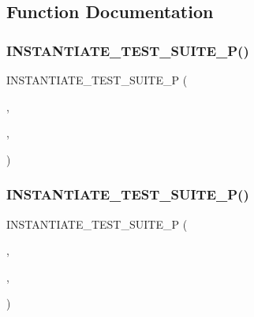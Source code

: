 \subsection{Function Documentation}
\mbox{\label{googletest-master_2googletest_2test_2googletest-test2__test_8cc_a9092fbc5f642e0be66474b214fae76c9}} 
\subsubsection{\texorpdfstring{INSTANTIATE\_TEST\_SUITE\_P()}{INSTANTIATE\_TEST\_SUITE\_P()}\hspace{0.1cm}{\footnotesize\ttfamily [1/2]}}
{\footnotesize\ttfamily I\+N\+S\+T\+A\+N\+T\+I\+A\+T\+E\+\_\+\+T\+E\+S\+T\+\_\+\+S\+U\+I\+T\+E\+\_\+P (\begin{DoxyParamCaption}\item[{Multiples\+Of33}]{,  }\item[{\mbox{\hyperlink{class_external_instantiation_test}{External\+Instantiation\+Test}}}]{,  }\item[{Values(33, 66)}]{ }\end{DoxyParamCaption})}

\mbox{\label{googletest-master_2googletest_2test_2googletest-test2__test_8cc_a636f24ec7688ea5d70c09b8b73639e55}} 
\subsubsection{\texorpdfstring{INSTANTIATE\_TEST\_SUITE\_P()}{INSTANTIATE\_TEST\_SUITE\_P()}\hspace{0.1cm}{\footnotesize\ttfamily [2/2]}}
{\footnotesize\ttfamily I\+N\+S\+T\+A\+N\+T\+I\+A\+T\+E\+\_\+\+T\+E\+S\+T\+\_\+\+S\+U\+I\+T\+E\+\_\+P (\begin{DoxyParamCaption}\item[{Sequence2}]{,  }\item[{\mbox{\hyperlink{class_instantiation_in_multiple_translation_units_test}{Instantiation\+In\+Multiple\+Translation\+Units\+Test}}}]{,  }\item[{Values(42 $\ast$3, 42 $\ast$4, 42 $\ast$5)}]{ }\end{DoxyParamCaption})}



